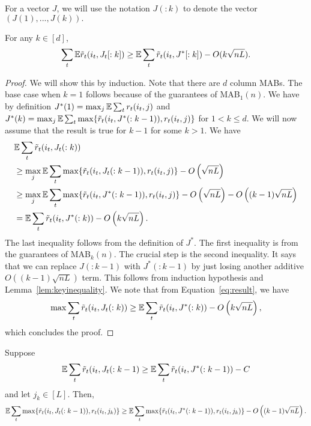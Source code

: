 For a vector $J$, we will use the notation $J(:k)$ to denote the vector $(J(1),...,J(k)).$
\begin{lemma}
\label{lem:keylem}

For any $k \in [d]$,
$$ \sum_t \mathbb{E} \tilde{r}_t(i_t, J_t[:k]) \geq  \mathbb{E} \sum_t \tilde{r}_t(i_t, J^*[:k]) - O(k\sqrt{nL}).$$ 

\end{lemma}
\begin{proof}
We will show this by induction. Note that there are $d$ column MABs. The base case when $k=1$ follows because of the guarantees of MAB$_1(n)$.
We have by definition $J^*(1) = \max_j   \mathbb{E} \sum_t  {r}_t(i_t, j) $ and $J^*(k) = \max_{j} \mathbb{E} \sum_t   \max \{  \tilde{r}_t(i_t, J^*(:k-1)), r_t(i_t,j) \}$ for $1 < k \leq d$.   We will now assume that the result is true for $k-1$ for some $k>1.$
We have 
\begin{align}
& \mathbb{E}  \sum_t \tilde{r}_t(i_t, J_t(:k))   \\
&\geq \max_{j} \mathbb{E} \sum_t   \max \{ \tilde{r}_t(i_t, J_t(:k-1)), r_t(i_t,j) \}  - O\left(\sqrt{nL}\right) \\
&\geq \max_{j} \mathbb{E} \sum_t   \max \{  \tilde{r}_t(i_t, J^*(:k-1)), r_t(i_t,j) \}   - O\left( \sqrt{nL} \right) - O\left( (k-1)\sqrt{nL} \right)   \\
\label{eq:result}
& =  \mathbb{E} \sum_t  \tilde{r}_t(i_t, J^*(:k))  - O\left( k\sqrt{nL} \right).
\end{align}
The last inequality follows from the definition of $J^*.$
The first inequality is from the guarantees of MAB$_k(n)$.  The crucial step is  the second inequality. It says that we can replace $J(:k-1)$ with $J^*(:k-1)$ by just losing another additive $O\left( (k-1) \sqrt{nL} \right)$ term. This follows from induction hypothesis and Lemma~\ref{lem:keyinequality}. We note that from Equation~\ref{eq:result}, we have
$$ \max  \sum_t \tilde{r}_t(i_t, J_t(:k))  \geq  \mathbb{E} \sum_t \tilde{r}_t(i_t, J^*(:k))  - O\left( k \sqrt{nL} \right),$$
which concludes the proof.
\end{proof}


\begin{lemma}
\label{lem:keyinequality}
Suppose
 $$ \mathbb{E} \sum_t \tilde{r}_t(i_t, J_t(:k-1) \geq  \mathbb{E} \sum_t \tilde{r}_t(i_t, J^*(:k-1))  - C$$
  and let $j_k \in [L].$ Then,
$$ \mathbb{E} \sum_t \max \{ \tilde{r}_t(i_t, J_t(:k-1)), r_t(i_t,j_k) \} \geq \mathbb{E} \sum_t  \max \{ \tilde{r}_t(i_t, J^*(:k-1)), r_t(i_t,j_k) \} - O\left((k-1) \sqrt{nL} \right).$$
\end{lemma}

